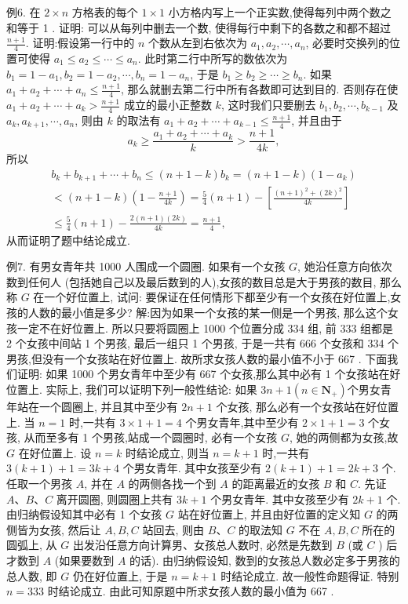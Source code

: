 例6. 在 $2 \times n$ 方格表的每个 $1 \times 1$ 小方格内写上一个正实数,使得每列中两个数之和等于 1 . 证明: 可以从每列中删去一个数, 使得每行中剩下的各数之和都不超过 $\frac{n+1}{4}$. 
证明:假设第一行中的 $n$ 个数从左到右依次为 $a_1, a_2, \cdots, a_n$, 必要时交换列的位置可使得 $a_1 \leqslant a_2 \leqslant \cdots \leqslant a_n$. 此时第二行中所写的数依次为 $b_1= 1-a_1, b_2=1-a_2, \cdots, b_n=1-a_n$, 于是 $b_1 \geqslant b_2 \geqslant \cdots \geqslant b_n$. 如果 $a_1+a_2+\cdots+ a_n \leqslant \frac{n+1}{4}$, 那么就删去第二行中所有各数即可达到目的.
否则存在使 $a_1+ a_2+\cdots+a_k>\frac{n+1}{4}$ 成立的最小正整数 $k$, 这时我们只要删去 $b_1, b_2, \cdots, b_{k-1}$ 及 $a_k, a_{k+1}, \cdots, a_n$, 则由 $k$ 的取法有 $a_1+a_2+\cdots+a_{k-1} \leqslant \frac{n+1}{4}$, 并且由于
$$
a_k \geqslant \frac{a_1+a_2+\cdots+a_k}{k}>\frac{n+1}{4 k},
$$
所以
$$
\begin{gathered}
b_k+b_{k+1}+\cdots+b_n \leqslant(n+1-k) b_k=(n+1-k)\left(1-a_k\right) \\
<(n+1-k)\left(1-\frac{n+1}{4 k}\right)=\frac{5}{4}(n+1)-\left[\frac{(n+1)^2+(2 k)^2}{4 k}\right] \\
\leqslant \frac{5}{4}(n+1)-\frac{2(n+1)(2 k)}{4 k}=\frac{n+1}{4},
\end{gathered}
$$
从而证明了题中结论成立.



例7. 有男女青年共 1000 人围成一个圆圈.
如果有一个女孩 $G$, 她沿任意方向依次数到任何人 (包括她自己以及最后数到的人),女孩的数目总是大于男孩的数目, 那么称 $G$ 在一个好位置上, 试问: 要保证在任何情形下都至少有一个女孩在好位置上,女孩的人数的最小值是多少?
解:因为如果一个女孩的某一侧是一个男孩, 那么这个女孩一定不在好位置上.
所以只要将圆圈上 1000 个位置分成 334 组, 前 333 组都是 2 个女孩中间站 1 个男孩, 最后一组只 1 个男孩, 于是一共有 666 个女孩和 334 个男孩,但没有一个女孩站在好位置上.
故所求女孩人数的最小值不小于 667 .
下面我们证明: 如果 1000 个男女青年中至少有 667 个女孩,那么其中必有 1 个女孩站在好位置上.
实际上, 我们可以证明下列一般性结论: 如果 $3 n+1\left(n \in \mathbf{N}_{+}\right)$个男女青年站在一个圆圈上, 并且其中至少有 $2 n+1$ 个女孩, 那么必有一个女孩站在好位置上.
当 $n=1$ 时,一共有 $3 \times 1+1=4$ 个男女青年,其中至少有 $2 \times 1+1=3$ 个女孩, 从而至多有 1 个男孩,站成一个圆圈时, 必有一个女孩 $G$, 她的两侧都为女孩,故 $G$ 在好位置上.
设 $n=k$ 时结论成立, 则当 $n=k+1$ 时,一共有 $3(k+1)+1=3 k+4$ 个男女青年.
其中女孩至少有 $2(k+1)+1=2 k+3$ 个.
任取一个男孩 $A$, 并在 $A$ 的两侧各找一个到 $A$ 的距离最近的女孩 $B$ 和 $C$. 先证 $A 、 B 、 C$ 离开圆圈, 则圆圈上共有 $3 k+1$ 个男女青年.
其中女孩至少有 $2 k+1$ 个.
由归纳假设知其中必有 1 个女孩 $G$ 站在好位置上, 并且由好位置的定义知 $G$ 的两侧皆为女孩, 然后让 $A, B, C$ 站回去, 则由 $B 、 C$ 的取法知 $G$ 不在 $A, B, C$ 所在的圆弧上, 从 $G$ 出发沿任意方向计算男、女孩总人数时, 必然是先数到 $B$ (或 $C$ ) 后才数到 $A$ (如果要数到 $A$ 的话). 由归纳假设知, 数到的女孩总人数必定多于男孩的总人数, 即 $G$ 仍在好位置上, 于是 $n=k+1$ 时结论成立.
故一般性命题得证.
特别 $n=333$ 时结论成立.
由此可知原题中所求女孩人数的最小值为 667 .




